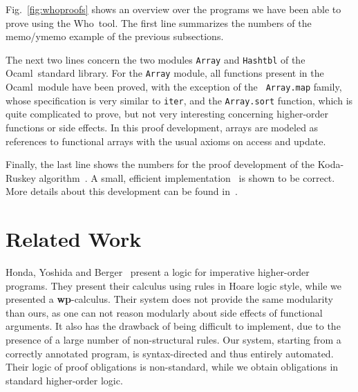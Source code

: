\documentclass[a4paper]{llncs}
\newcommand{\wpre}{{\bf wp}}
\newcommand{\who}{Who}
\newcommand{\ocaml}{Ocaml}
\begin{document}
Fig.~\ref{fig:whoproofs} shows an overview over the programs we have been able
to prove using the \who\ tool. The first line summarizes the numbers of the
memo/ymemo example of the previous subsections. 

The next two lines concern the two modules {\tt Array} and {\tt Hashtbl} of
the \ocaml\ standard library. For the {\tt Array} module, all functions
present in the \ocaml\ module have been proved, with the exception of the {\tt
Array.map} family, whose specification is very similar to {\tt iter}, and the
{\tt Array.sort} function, which is quite complicated to prove, but not very
interesting concerning higher-order functions or side effects. In this proof
development, arrays are modeled as references to functional arrays with the
usual axioms on access and update.


Finally, the last line shows the numbers for the proof development of the
Koda-Ruskey algorithm~\cite{KodaRuskey93}. A small, efficient
implementation~\cite{FilliatrePottier02} is shown to be correct. More details
about this development can be found in~\cite{KanigFilliatre09wml}.

\section{Related Work}
\label{sec:related}

Honda, Yoshida and
Berger~\cite{Honda05anobservationally,BergerHondaYoshida05aliasing} present a
logic for imperative higher-order programs. They present their calculus using
rules in Hoare logic style, while we presented a \wpre-calculus. Their system
does not provide the same modularity than ours, as one can not reason
modularly about side effects of functional arguments. It also has the drawback
of being difficult to implement, due to the presence of a large number of
non-structural rules. Our system, starting from a correctly annotated program,
is syntax-directed and thus entirely automated. Their logic of proof
obligations is non-standard, while we obtain obligations in standard higher-order
logic. 
\end{document}
